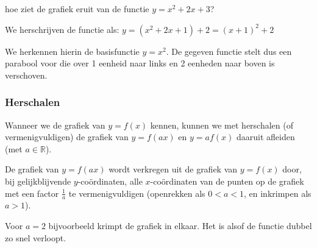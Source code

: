 \begin{voorbeeld}
hoe ziet de grafiek eruit van de functie $y=x^{2}+2x+3$?

We herschrijven de functie als: $y=\left(x^{2}+2x+1\right)+2=\left(x+1\right)^{2}+2$

We herkennen hierin de basisfunctie $y=x^{2}$. De gegeven functie
stelt dus een parabool voor die over 1 eenheid naar links en 2 eenheden
naar boven is verschoven.
\end{voorbeeld}


\subsubsection{Herschalen}

Wanneer we de grafiek van $y=f(x)$ kennen, kunnen we met
herschalen (of vermenigvuldigen) de grafiek van $y=f(ax)$ en $y=af(x)$
daaruit afleiden (met $a\in\mathbb{R}$).

De grafiek van $y=f(ax)$ wordt verkregen uit de grafiek
van $y=f(x)$ door, bij gelijkblijvende $y$-co\"ordinaten, alle $x$-co\"ordinaten
van de punten op de grafiek met een factor $\frac{1}{a}$ te vermenigvuldigen
(openrekken als $0<a<1$, en inkrimpen als $a>1$).

Voor $a=2$ bijvoorbeeld krimpt de grafiek in elkaar. Het
is alsof de functie dubbel zo snel verloopt.

\begin{center}
	
\end{center}

\begin{center}
	
\end{center}





